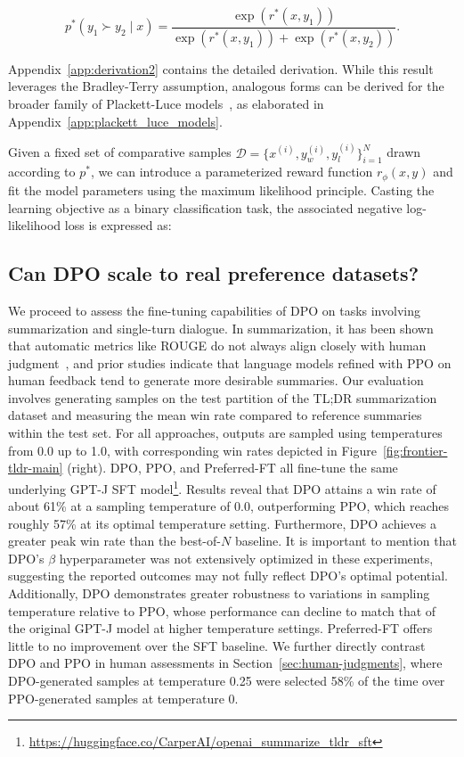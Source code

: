 \begin{equation}\label{eq:bradley-terry}
    p^*(y_1\succ y_2 \mid x)=\frac{\exp\left(r^*(x, y_1)\right)}{\exp\left(r^*(x, y_1)\right) + \exp\left(r^*(x, y_2)\right)}.
\end{equation}

Appendix~\ref{app:derivation2} contains the detailed derivation. While this result leverages the Bradley-Terry assumption, analogous forms can be derived for the broader family of Plackett-Luce models~\citep{plackett1975analysis, luce2012individual}, as elaborated in Appendix~\ref{app:plackett_luce_models}.

Given a fixed set of comparative samples $\mathcal{D}=\bigl\{x^{(i)}, y_w^{(i)}, y_l^{(i)}\bigr\}_{i=1}^N$ drawn according to $p^*$, we can introduce a parameterized reward function $r_{\phi}(x, y)$ and fit the model parameters using the maximum likelihood principle. Casting the learning objective as a binary classification task, the associated negative log-likelihood loss is expressed as:

\subsection{Can DPO scale to real preference datasets?}
\label{sec:dpo-real-datasets}
We proceed to assess the fine-tuning capabilities of DPO on tasks involving summarization and single-turn dialogue. In summarization, it has been shown that automatic metrics like ROUGE do not always align closely with human judgment~\citep{stiennon2022learning}, and prior studies indicate that language models refined with PPO on human feedback tend to generate more desirable summaries. Our evaluation involves generating samples on the test partition of the TL;DR summarization dataset and measuring the mean win rate compared to reference summaries within the test set. For all approaches, outputs are sampled using temperatures from 0.0 up to 1.0, with corresponding win rates depicted in Figure~\ref{fig:frontier-tldr-main} (right). DPO, PPO, and Preferred-FT all fine-tune the same underlying GPT-J SFT model\footnote{\url{https://huggingface.co/CarperAI/openai_summarize_tldr_sft}}. Results reveal that DPO attains a win rate of about 61\% at a sampling temperature of 0.0, outperforming PPO, which reaches roughly 57\% at its optimal temperature setting. Furthermore, DPO achieves a greater peak win rate than the best-of-$N$ baseline. It is important to mention that DPO’s $\beta$ hyperparameter was not extensively optimized in these experiments, suggesting the reported outcomes may not fully reflect DPO’s optimal potential. Additionally, DPO demonstrates greater robustness to variations in sampling temperature relative to PPO, whose performance can decline to match that of the original GPT-J model at higher temperature settings. Preferred-FT offers little to no improvement over the SFT baseline. We further directly contrast DPO and PPO in human assessments in Section~\ref{sec:human-judgments}, where DPO-generated samples at temperature 0.25 were selected 58\% of the time over PPO-generated samples at temperature 0.

